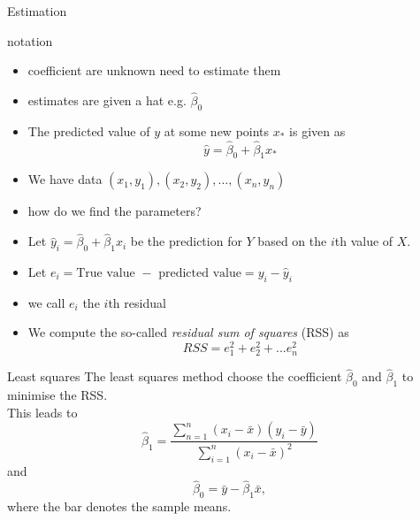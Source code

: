 \documentclass{bredelebeamer}
\begin{document}
\begin{frame}{Estimation}
\begin{block}{notation}
\begin{itemize}
	\item coefficient are unknown need to estimate them
\item estimates are given a hat e.g. $\hat{\beta}_0$
\item The predicted value of $y$ at some new points $x_*$ is given as
\begin{equation}
\hat{y} = \hat{\beta}_0 + \hat{\beta}_1x_*
\end{equation}
\item We have data $(x_1,y_1),(x_2, y_2),...,(x_n,y_n)$
\item how do we find the parameters?
\item Let $\hat{y}_i = \hat{\beta}_0 + \hat{\beta}_1x_i$ be the prediction for $Y$ based on the $i$th value of $X$.
\item Let $e_i = \text{True value } - \text{ predicted value} = y_i - \hat{y}_i$
\item we call $e_i$ the $i$th residual
\item We compute the so-called \textit{residual sum of squares} (RSS) as
\begin{equation}
RSS = e^2_1 + e^2_2 + ... e^2_n
\end{equation}

\end{itemize}

\end{block}

\end{frame}

\begin{frame}{Least squares}
The least squares method choose the coefficient $\hat{\beta}_0$ and $\hat{\beta}_1$ to minimise the RSS.
\\
This leads to
\begin{equation}
\hat{\beta}_1 = \frac{\sum_{n=1}^{n}(x_i - \bar{x})(y_i - \bar{y})}{\sum_{i=1}^{n}(x_i - \bar{x})^2}
\end{equation}
and
\begin{equation}
\hat{\beta}_0 = \bar{y} - \hat{\beta}_1 \bar{x},
\end{equation}
where the bar denotes the sample means.
\end{frame}
\end{document}
